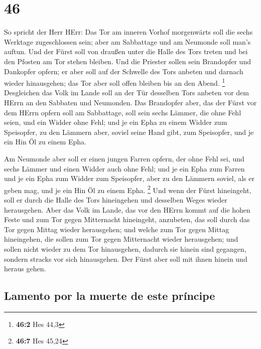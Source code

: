 \hypertarget{section-45}{%
\section{46}\label{section-45}}

 So spricht der Herr HErr: Das Tor am inneren Vorhof
morgenwärts soll die sechs Werktage zugeschlossen sein; aber am
Sabbattage und am Neumonde soll man's auftun.  Und der
Fürst soll von draußen unter die Halle des Tors treten und bei den
Pfosten am Tor stehen bleiben. Und die Priester sollen sein Brandopfer
und Dankopfer opfern; er aber soll auf der Schwelle des Tors anbeten und
darnach wieder hinausgehen; das Tor aber soll offen bleiben bis an den
Abend. \footnote{\textbf{46:2} Hes 44,3}  Desgleichen das
Volk im Lande soll an der Tür desselben Tors anbeten vor dem HErrn an
den Sabbaten und Neumonden.  Das Brandopfer aber, das der
Fürst vor dem HErrn opfern soll am Sabbattage, soll sein sechs Lämmer,
die ohne Fehl seien, und ein Widder ohne Fehl;  und je ein
Epha zu einem Widder zum Speisopfer, zu den Lämmern aber, soviel seine
Hand gibt, zum Speisopfer, und je ein Hin Öl zu einem Epha.

 Am Neumonde aber soll er einen jungen Farren opfern, der
ohne Fehl sei, und sechs Lämmer und einen Widder auch ohne Fehl;
 und je ein Epha zum Farren und je ein Epha zum Widder zum
Speisopfer, aber zu den Lämmern soviel, als er geben mag, und je ein Hin
Öl zu einem Epha. \footnote{\textbf{46:7} Hes 45,24}  Und
wenn der Fürst hineingeht, soll er durch die Halle des Tors hineingehen
und desselben Weges wieder herausgehen.  Aber das Volk im
Lande, das vor den HErrn kommt auf die hohen Feste und zum Tor gegen
Mitternacht hineingeht, anzubeten, das soll durch das Tor gegen Mittag
wieder herausgehen; und welche zum Tor gegen Mittag hineingehen, die
sollen zum Tor gegen Mitternacht wieder herausgehen; und sollen nicht
wieder zu dem Tor hinausgehen, dadurch sie hinein sind gegangen, sondern
stracks vor sich hinausgehen.  Der Fürst aber soll mit
ihnen hinein und heraus gehen.

\hypertarget{lamento-por-la-muerte-de-este-pruxedncipe}{%
\subsection{Lamento por la muerte de este
príncipe}\label{lamento-por-la-muerte-de-este-pruxedncipe}}

